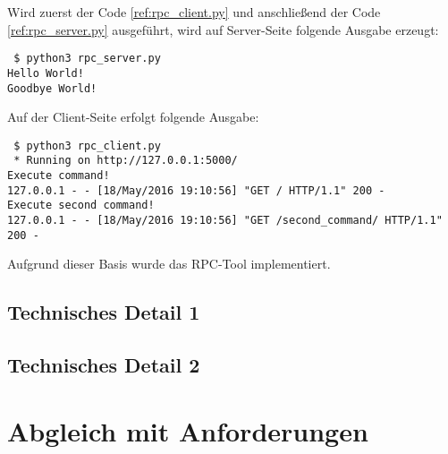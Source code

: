 Wird zuerst der Code \ref{ref:rpc_client.py} und anschließend der Code \ref{ref:rpc_server.py} ausgeführt, wird auf Server-Seite folgende Ausgabe erzeugt:
\begin{lstlisting}
 $ python3 rpc_server.py
Hello World!
Goodbye World!
\end{lstlisting}
Auf der Client-Seite erfolgt folgende Ausgabe:
\begin{lstlisting}
 $ python3 rpc_client.py
 * Running on http://127.0.0.1:5000/
Execute command!
127.0.0.1 - - [18/May/2016 19:10:56] "GET / HTTP/1.1" 200 -
Execute second command!
127.0.0.1 - - [18/May/2016 19:10:56] "GET /second_command/ HTTP/1.1" 200 -
\end{lstlisting}

Aufgrund dieser Basis wurde das RPC-Tool implementiert.


		\subsection{Technisches Detail 1}
		\subsection{Technisches Detail 2}
	\section{Abgleich mit Anforderungen}